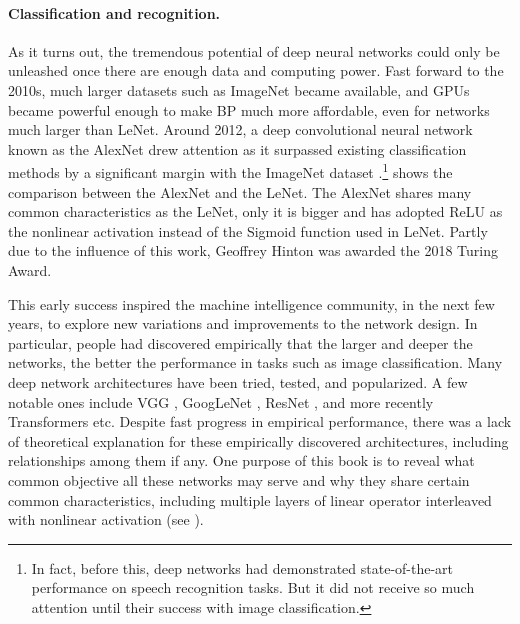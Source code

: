 \documentclass[../../book-main.tex]{subfiles}
\begin{document}
\paragraph{Classification and recognition.}
As it turns out, the tremendous potential of deep neural networks could only be unleashed once there are enough data and computing power. Fast forward to the 2010s, much larger datasets such as ImageNet became available, and GPUs became powerful enough to make BP much more affordable, even for networks much larger than LeNet. Around 2012, a deep convolutional neural network known as the AlexNet drew attention as it surpassed existing classification methods by a significant margin with the ImageNet dataset \cite{krizhevsky2012imagenet}.\footnote{In fact, before this, deep networks had demonstrated state-of-the-art performance on speech recognition tasks. But it did not receive so much attention until their success with image classification.}  shows the comparison between the AlexNet and the LeNet. The AlexNet shares many common characteristics as the LeNet, only it is bigger and has adopted ReLU as the nonlinear activation instead of the Sigmoid function used in LeNet. Partly due to the influence of this work, Geoffrey Hinton was awarded the 2018 Turing Award.


This early success inspired the machine intelligence community, in the next few years, to explore new variations and improvements to the network design. In particular, people had discovered empirically that the larger and deeper the networks, the better the performance in tasks such as image classification. Many deep network architectures have been tried, tested, and popularized. A few notable ones include VGG \cite{Simonyan15}, GoogLeNet \cite{Szegedy2014GoingDW}, ResNet \cite{He2016-lc}, and more recently Transformers \cite{vaswani2017attention} etc. Despite fast progress in empirical performance, there was a lack of theoretical explanation for these empirically discovered architectures, including relationships among them if any. One purpose of this book is to reveal what common objective all these networks may serve and why they share certain common characteristics, including multiple layers of linear operator interleaved with nonlinear activation (see ). 
\end{document}
